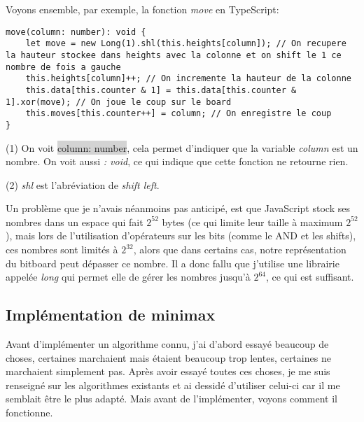 \documentclass[a4paper]{article}
\newcommand{\inlinecode}[1]{\colorbox{lightgray}{#1}}
\begin{document}
	Voyons ensemble, par exemple, la fonction \textit{move} en TypeScript:
	\begin{lstlisting}
move(column: number): void {
    let move = new Long(1).shl(this.heights[column]); // On recupere la hauteur stockee dans heights avec la colonne et on shift le 1 ce nombre de fois a gauche
    this.heights[column]++; // On incremente la hauteur de la colonne
    this.data[this.counter & 1] = this.data[this.counter & 1].xor(move); // On joue le coup sur le board
    this.moves[this.counter++] = column; // On enregistre le coup
}
	\end{lstlisting}

	(1) On voit \inlinecode{column: number}, cela permet d'indiquer que la variable \textit{column} est un nombre. On voit aussi \textit{: void}, ce qui indique que cette fonction ne retourne rien.
	
    (2) \textit{shl} est l'abréviation de \textit{shift left}.

	
	Un problème que je n'avais néanmoins pas anticipé, est que JavaScript stock ses nombres dans un espace qui fait $2^{52}$ bytes (ce qui limite leur taille à maximum $2^{52}$), mais lors de l'utilisation d'opérateurs sur les bits (comme le AND et les shifts), ces nombres sont limités à $2^{32}$, alors que dans certains cas, notre représentation du bitboard peut dépasser ce nombre. Il a donc fallu que j'utilise une librairie appelée \textit{long} qui permet elle de gérer les nombres jusqu'à $2^{64}$, ce qui est suffisant.

\subsection{Implémentation de minimax}

    Avant d'implémenter un algorithme connu, j'ai d'abord essayé beaucoup de choses, certaines marchaient mais étaient beaucoup trop lentes, certaines ne marchaient simplement pas. Après avoir essayé toutes ces choses, je me suis renseigné sur les algorithmes existants et ai dessidé d'utiliser celui-ci car il me semblait être le plus adapté. Mais avant de l'implémenter, voyons comment il fonctionne.
    
\end{document}
